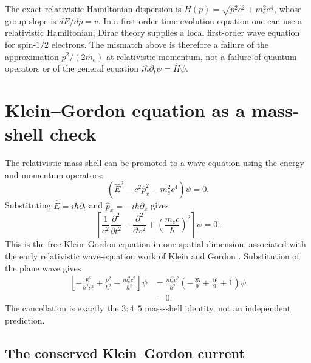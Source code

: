 \documentclass[12pt]{article}
\begin{document}
The exact relativistic Hamiltonian dispersion is $H(p)=\sqrt{p^2c^2+m_e^2c^4}$, whose group slope is $dE/dp=v$. In a first-order time-evolution equation one can use a relativistic Hamiltonian; Dirac theory supplies a local first-order wave equation for spin-$1/2$ electrons. The mismatch above is therefore a failure of the approximation $p^2/(2m_e)$ at relativistic momentum, not a failure of quantum operators or of the general equation $i\hbar\partial_t\psi=\hat H\psi$.

\section{Klein--Gordon equation as a mass-shell check}

The relativistic mass shell can be promoted to a wave equation using the energy and momentum operators:
\begin{equation}
  \left(\hat E^2-c^2\hat p_x^2-m_e^2c^4\right)\psi=0.
  \label{eq:mass-shell-operator}
\end{equation}
Substituting $\hat E=i\hbar\partial_t$ and $\hat p_x=-i\hbar\partial_x$ gives
\begin{equation}
  \left[
    \frac{1}{c^2}\frac{\partial^2}{\partial t^2}
    -\frac{\partial^2}{\partial x^2}
    +\left(\frac{m_ec}{\hbar}\right)^2
  \right]\psi=0.
  \label{eq:klein-gordon}
\end{equation}
This is the free Klein--Gordon equation in one spatial dimension, associated with the early relativistic wave-equation work of Klein and Gordon \cite{Klein1926,Gordon1926}. Substitution of the plane wave gives
\begin{align}
  \left[
    -\frac{E^2}{\hbar^2c^2}
    +\frac{p^2}{\hbar^2}
    +\frac{m_e^2c^2}{\hbar^2}
  \right]\psi
  &=\frac{m_e^2c^2}{\hbar^2}
    \left(-\frac{25}{9}+\frac{16}{9}+1\right)\psi \\
  &=0.
  \label{eq:kg-substitution}
\end{align}
The cancellation is exactly the $3{:}4{:}5$ mass-shell identity, not an independent prediction.

\subsection{The conserved Klein--Gordon current}
\end{document}
